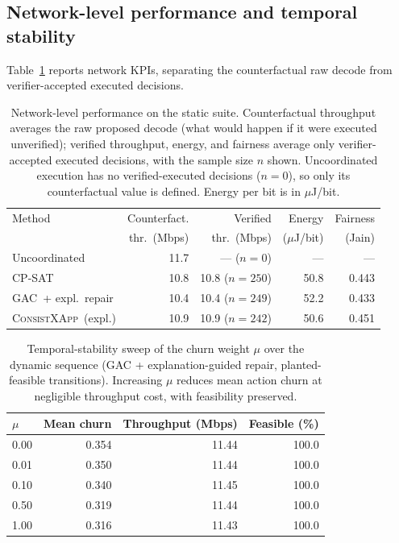 \documentclass[pdflatex,sn-mathphys-num,iicol,oneside]{sn-jnl}
\newcommand{\method}{\textsc{ConsistXApp}}
\newcommand{\gac}{\textsc{GAC}}
\newcommand{\cpsat}{\textsc{CP-SAT}}
\begin{document}
\subsection{Network-level performance and temporal stability}

Table~\ref{tab:temporal-results} reports network KPIs, separating the
counterfactual raw decode from verifier-accepted executed decisions.

\begin{table}[t]
\centering
\caption{Network-level performance on the static suite. Counterfactual
throughput averages the raw proposed decode (what would happen if it
were executed unverified); verified throughput, energy, and fairness
average only verifier-accepted executed decisions, with the sample size
$n$ shown. Uncoordinated execution has no verified-executed decisions
($n=0$), so only its counterfactual value is defined. Energy per bit is
in $\mu$J/bit.}
\label{tab:temporal-results}
\setlength{\tabcolsep}{4pt}\small
\begin{tabular}{lrrrr}
\toprule
Method & Counterfact. & Verified & Energy & Fairness\\
& thr.\ (Mbps) & thr.\ (Mbps) & ($\mu$J/bit) & (Jain)\\
\midrule
Uncoordinated & 11.7 & --- ($n{=}0$) & --- & ---\\
\cpsat & 10.8 & 10.8 ($n{=}250$) & 50.8 & 0.443\\
\gac\ + expl.\ repair & 10.4 & 10.4 ($n{=}249$) & 52.2 & 0.433\\
\method\ (expl.) & 10.9 & 10.9 ($n{=}242$) & 50.6 & 0.451\\
\bottomrule
\end{tabular}
\normalsize
\end{table}

\begin{table}[t]
\centering
\caption{Temporal-stability sweep of the churn weight $\mu$ over the
dynamic sequence (GAC + explanation-guided repair, planted-feasible
transitions). Increasing $\mu$ reduces mean action churn at negligible
throughput cost, with feasibility preserved.}
\label{tab:temporal-mu}
\setlength{\tabcolsep}{4pt}\small
\begin{tabular}{lrrr}
\toprule
$\mu$ & Mean churn & Throughput (Mbps) & Feasible (\%)\\
\midrule
0.00 & 0.354 & 11.44 & 100.0\\
0.01 & 0.350 & 11.44 & 100.0\\
0.10 & 0.340 & 11.45 & 100.0\\
0.50 & 0.319 & 11.44 & 100.0\\
1.00 & 0.316 & 11.43 & 100.0\\
\bottomrule
\end{tabular}
\normalsize
\end{table}
\end{document}
